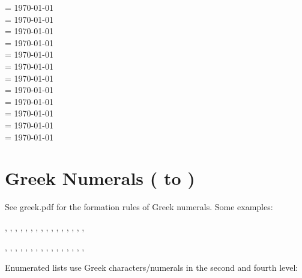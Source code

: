 \documentclass[a4paper]{article}
\begin{document}
 \month=\value{foo} \today \\
 \month=\value{foo} \today \\
 \month=\value{foo} \today \\
 \month=\value{foo} \today \\
 \month=\value{foo} \today \\
 \month=\value{foo} \today \\
 \month=\value{foo} \today \\
 \month=\value{foo} \today \\
 \month=\value{foo} \today \\
 \month=\value{foo} \today \\
 \month=\value{foo} \today \\
 \month=\value{foo} \today \\

\section{Greek Numerals ( to )}

See greek.pdf for the formation rules of Greek numerals.
Some examples:


,
,
,
,
,
,
,
,
,
,
,
,
,
,
,
,

,
,
,
,
,
,
,
,
,
,
,
,
,
,
,
,


Enumerated lists use Greek characters/numerals in the second and fourth level:
\end{document}
